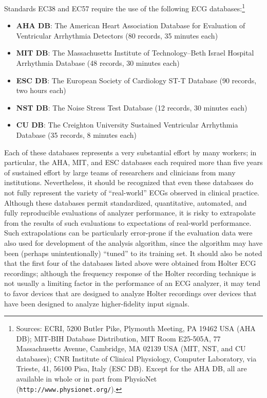 \documentclass[twoside]{article}
\begin{document}
Standards EC38 and EC57 require the use of the following ECG
databases:\footnote{Sources: ECRI, 5200 Butler Pike, Plymouth Meeting,
PA 19462 USA (AHA DB); MIT-BIH Database Distribution, MIT Room
E25-505A, 77 Massachusetts Avenue, Cambridge, MA 02139 USA (MIT, NST,
and CU databases); CNR Institute of Clinical Physiology, Computer
Laboratory, via Trieste, 41, 56100 Pisa, Italy (ESC DB).  Except for
the AHA DB, all are available in whole or in part from PhysioNet
({\tt http://www.\-physio\-net.\-org/}).}
\begin{itemize}
   \item {\bf AHA DB}: The American Heart Association Database for
Evaluation of Ventricular Arrhythmia Detectors (80 records, 35 minutes
each)

   \item {\bf MIT DB}: The Massachusetts Institute of Technology--Beth
Israel Hospital Arrhythmia Database (48 records, 30 minutes each)

   \item {\bf ESC DB}: The European Society of Cardiology ST-T
Database (90 records, two hours each)

   \item {\bf NST DB}: The Noise Stress Test Database (12 records, 30
minutes each)

   \item {\bf CU DB}: The Creighton University Sustained Ventricular
Arrhythmia Database (35 records, 8 minutes each)

\end{itemize}
Each of these databases represents a very substantial effort by many
workers; in particular, the AHA, MIT, and ESC databases each required
more than five years of sustained effort by large teams of researchers
and clinicians from many institutions.  Nevertheless, it should be
recognized that even these databases do not fully represent the
variety of ``real-world'' ECGs observed in clinical practice.
Although these databases permit standardized, quantitative, automated,
and fully reproducible evaluations of analyzer performance, it is
risky to extrapolate from the results of such evaluations to
expectations of real-world performance.  Such extrapolations can be
particularly error-prone if the evaluation data were also used for
development of the analysis algorithm, since the algorithm may have
been (perhaps unintentionally) ``tuned'' to its training set.  It
should also be noted that the first four of the databases listed above were
obtained from Holter ECG recordings; although the frequency response
of the Holter recording technique is not usually a limiting factor in
the performance of an ECG analyzer, it may tend to favor devices that
are designed to analyze Holter recordings over devices that have been
designed to analyze higher-fidelity input signals.
\end{document}
